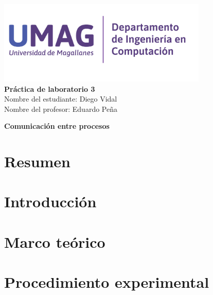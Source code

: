 \documentclass{article}
\begin{document}
\begin{titlepage}
    \begin{center}
        \includegraphics[width=10cm]{UMAG INGENIERÍA_depto_compu01.png} \\
        \vspace{4cm}
        {\Huge \textbf{Práctica de laboratorio 3}} \\ %
        \vspace{1cm}
        {\Large Nombre del estudiante: Diego Vidal} \\ %
        \vspace{0.5cm}
        {\Large Nombre del profesor: Eduardo Peña}
        
        \vspace{0.5cm}
        {\Huge \textbf{Comunicación entre procesos}}
    \end{center}
\end{titlepage}

\tableofcontents
\newpage

\section{Resumen}

\newpage

\section{Introducción}

\newpage

\section{Marco teórico}

\newpage

\section{Procedimiento experimental}
\end{document}
